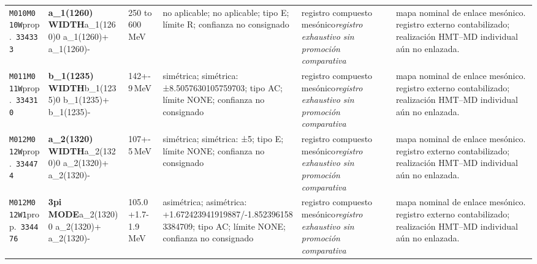\begin{landscape}
\begin{longtable}{L{1.85cm}L{4.45cm}L{2.35cm}L{4.05cm}L{3.35cm}L{7.15cm}}
\texttt{M010}\newline \texttt{M010W}\newline prop.\ \texttt{334333} & \textbf{a\_\allowbreak{}1(1260) WIDTH}\newline a\_\allowbreak{}1(1260)0 \textbar{}\allowbreak{} a\_\allowbreak{}1(1260)+ \textbar{}\allowbreak{} a\_\allowbreak{}1(1260)- & 250 to 600\,MeV & no aplicable; no aplicable; tipo E; límite R; confianza no consignado & registro compuesto mesónico\newline \emph{registro exhaustivo sin promoción comparativa} & mapa nominal de enlace mesónico. registro externo contabilizado; realización HMT--MD individual aún no enlazada. \\
\texttt{M011}\newline \texttt{M011W}\newline prop.\ \texttt{334310} & \textbf{b\_\allowbreak{}1(1235) WIDTH}\newline b\_\allowbreak{}1(1235)0 \textbar{}\allowbreak{} b\_\allowbreak{}1(1235)+ \textbar{}\allowbreak{} b\_\allowbreak{}1(1235)- & 142+-9\,MeV & simétrica; simétrica: ±8.5057630105759703; tipo AC; límite NONE; confianza no consignado & registro compuesto mesónico\newline \emph{registro exhaustivo sin promoción comparativa} & mapa nominal de enlace mesónico. registro externo contabilizado; realización HMT--MD individual aún no enlazada. \\
\texttt{M012}\newline \texttt{M012W}\newline prop.\ \texttt{334474} & \textbf{a\_\allowbreak{}2(1320) WIDTH}\newline a\_\allowbreak{}2(1320)0 \textbar{}\allowbreak{} a\_\allowbreak{}2(1320)+ \textbar{}\allowbreak{} a\_\allowbreak{}2(1320)- & 107+-5\,MeV & simétrica; simétrica: ±5; tipo E; límite NONE; confianza no consignado & registro compuesto mesónico\newline \emph{registro exhaustivo sin promoción comparativa} & mapa nominal de enlace mesónico. registro externo contabilizado; realización HMT--MD individual aún no enlazada. \\
\texttt{M012}\newline \texttt{M012W1}\newline prop.\ \texttt{334476} & \textbf{3pi MODE}\newline a\_\allowbreak{}2(1320)0 \textbar{}\allowbreak{} a\_\allowbreak{}2(1320)+ \textbar{}\allowbreak{} a\_\allowbreak{}2(1320)- & 105.0+1.7-1.9\,MeV & asimétrica; asimétrica: +1.672423941919887/-1.8523961583384709; tipo AC; límite NONE; confianza no consignado & registro compuesto mesónico\newline \emph{registro exhaustivo sin promoción comparativa} & mapa nominal de enlace mesónico. registro externo contabilizado; realización HMT--MD individual aún no enlazada. \\

\end{longtable}
\end{landscape}
